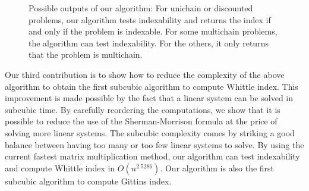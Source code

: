 \begin{figure}[ht]
    \centering
    \caption{Possible outputs of our algorithm: For unichain or discounted problems, our algorithm tests indexability and returns the index if and only if the problem is indexable. For some multichain problems, the algorithm can test indexability. For the others, it only returns that the problem is multichain.}
    \label{fig:possible_outputs}
\end{figure}

Our third contribution is to show how to reduce the complexity of the above algorithm to obtain the first subcubic algorithm to compute Whittle index. This improvement is made possible by the fact that a linear system can be solved in subcubic time. By carefully reordering the computations, we show that it is possible to reduce the use of the Sherman-Morrison formula at the price of solving more linear systems. The subcubic complexity comes by striking  a good balance between having too many or too few linear systems to solve. By using the current fastest matrix multiplication method, our algorithm can test indexability and compute Whittle index in $O(n^{2.5286})$. Our algorithm is also the first subcubic algorithm to compute Gittins index.

